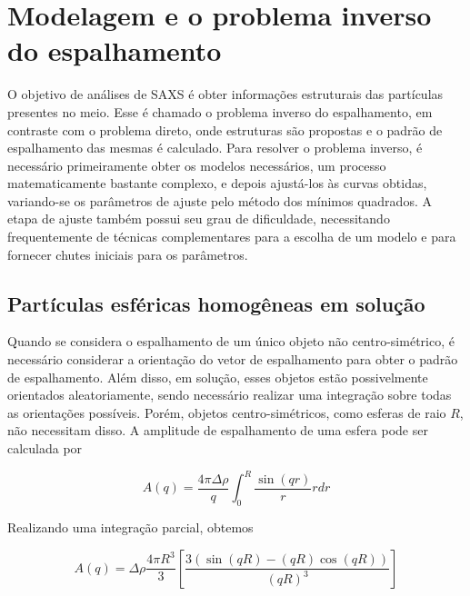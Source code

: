 		\section{Modelagem e o problema inverso do espalhamento}
		
		O objetivo de análises de SAXS é obter informações estruturais das partículas presentes no meio. Esse é chamado o problema inverso do espalhamento, em contraste com o problema direto, onde estruturas são propostas e o padrão de espalhamento das mesmas é calculado. Para resolver o problema inverso, é necessário primeiramente obter os modelos necessários, um processo matematicamente bastante complexo, e depois ajustá-los às curvas obtidas, variando-se os parâmetros de ajuste pelo método dos mínimos quadrados.\cite{Glatter2018livro} A etapa de ajuste também possui seu grau de dificuldade, necessitando frequentemente de técnicas complementares para a escolha de um modelo e para fornecer chutes iniciais para os parâmetros. 
		
		\subsection{Partículas esféricas homogêneas em solução} 
		
		Quando se considera o espalhamento de um único objeto não centro-simétrico, é necessário considerar a orientação do vetor de espalhamento \q{} para obter o padrão de espalhamento. Além disso, em solução, esses objetos estão possivelmente orientados aleatoriamente, sendo necessário realizar uma integração sobre todas as orientações possíveis. Porém, objetos centro-simétricos, como esferas de raio \(R\), não necessitam disso.  A amplitude de espalhamento de uma esfera pode ser calculada por \cite{Narayanan2008a, Pedersen_Aula1}
		
		\begin{equation}
			A(q) = \dfrac{4\pi\Delta\rho}{q} \int_0^R \dfrac{\sin(qr)}{r} rdr
			\label{eqn:SAXS_amplitude_esfera}
		\end{equation}
				
		Realizando uma integração parcial, obtemos\cite{Pedersen_Aula1}
		
		\begin{equation}
			A(q) = \Delta\rho \dfrac{4\pi R^3}{3} \left[ \dfrac{3 \left( \sin (qR) - (qR) \cos (qR) \right)}{\left(qR\right)^3} \right]
			\label{eqn:SAXS_amplitude_esfera_integrado}
		\end{equation}
		
